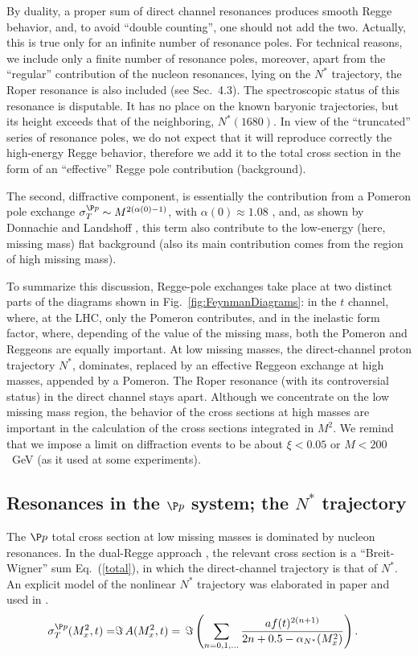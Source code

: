\documentclass[12pt]{article}
\begin{document}
By duality, a proper sum of direct channel resonances produces smooth Regge behavior, and, to avoid ``double counting'', one should not add the two. Actually, this is true only for an infinite number of resonance poles. For technical reasons, we include only a finite number of resonance poles, moreover, apart from the ``regular'' contribution of the nucleon resonances, lying on the $N^*$ trajectory, the Roper resonance is also included (see Sec.~4.3). The spectroscopic status of this resonance is disputable. It has no place on the known baryonic trajectories, but its height exceeds that of the neighboring, $N^*(1680)$. In view of the ``truncated'' series of resonance poles, we do not expect that it will reproduce correctly the high-energy Regge behavior, therefore we add it to the total cross section in the form of an ``effective'' Regge pole contribution (background).

The second, diffractive component, is essentially the contribution from a Pomeron pole exchange
%
{\footnotesize $\sigma^{\P p}_T\sim M^{2(\alpha(0)-1)}$}, with $\alpha(0)\approx 1.08$ \cite{DL},
and, as shown by Donnachie and Landshoff \cite{DL}, this term also contribute to the low-energy (here, missing mass) flat background (also its main contribution comes from the region of high missing mass).

To summarize this discussion, Regge-pole exchanges take place at two distinct parts of the diagrams shown in Fig.~\ref{fig:FeynmanDiagrams}: in the $t$ channel, where, at the LHC, only the Pomeron contributes, and in the inelastic form factor, where, depending of the value of the missing mass, both the Pomeron and Reggeons are equally important. At low missing masses, the direct-channel proton trajectory $N^*$, dominates, replaced by an effective Reggeon exchange at high masses, appended by a Pomeron. The Roper resonance (with its controversial status) in the direct channel stays apart. Although we concentrate on the low missing mass region, the behavior of the cross sections at high masses are important in the calculation of the cross sections integrated in $M^2$. We remind that we impose a limit on diffraction events to be about $\xi<0.05$ or $M<200$~GeV (as it used at some experiments).

\subsection{Resonances in the $\P p$ system; the $N^*$ trajectory}\label{Sec:trajectory}
The $\P p$ total cross section at low missing masses is dominated by nucleon resonances. In the dual-Regge approach \cite{PR}, the relevant cross section is a ``Breit-Wigner'' sum Eq.~(\ref{total}), in which the direct-channel trajectory is that of $N^*$. An explicit model of the nonlinear $N^*$ trajectory was elaborated in paper \cite{Paccanoni} and used in \cite{PR}.
\begin{eqnarray}\label{total}
\sigma^{\P p}_T(M_x^2,t)=&\Im\, A(M_x^2,t)=
    \,\Im\left(\sum_{n=0,1,...}\frac{a f(t)^{2(n+1)}}{2n+0.5-\alpha_{N^*}(M_x^2)}\right).\nonumber 
\end{eqnarray}
\end{document}
